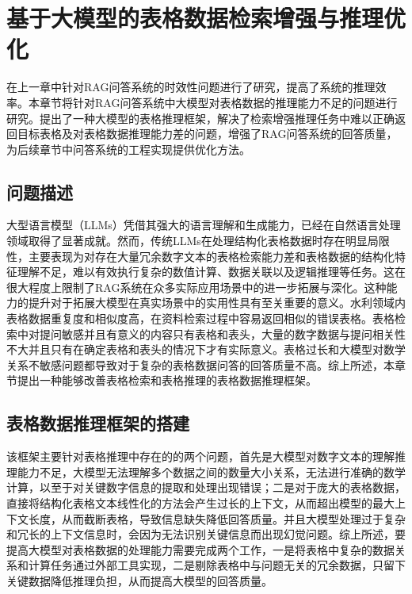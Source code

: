 \chapter{基于大模型的表格数据检索增强与推理优化}
\label{cha:第四章}
在上一章中针对RAG问答系统的时效性问题进行了研究，提高了系统的推理效率。本章节将针对RAG问答系统中大模型对表格数据的推理能力不足的问题进行研究。提出了一种大模型的表格推理框架，解决了检索增强推理任务中难以正确返回目标表格及对表格数据推理能力差的问题，增强了RAG问答系统的回答质量，为后续章节中问答系统的工程实现提供优化方法。
\section{问题描述}
大型语言模型（LLMs）凭借其强大的语言理解和生成能力，已经在自然语言处理领域取得了显著成就。然而，传统LLMs在处理结构化表格数据时存在明显局限性，主要表现为对存在大量冗余数字文本的表格检索能力差和表格数据的结构化特征理解不足，难以有效执行复杂的数值计算、数据关联以及逻辑推理等任务。这在很大程度上限制了RAG系统在众多实际应用场景中的进一步拓展与深化。这种能力的提升对于拓展大模型在真实场景中的实用性具有至关重要的意义。水利领域内表格数据重复度和相似度高，在资料检索过程中容易返回相似的错误表格。表格检索中对提问敏感并且有意义的内容只有表格和表头，大量的数字数据与提问相关性不大并且只有在确定表格和表头的情况下才有实际意义。表格过长和大模型对数学关系不敏感问题都导致对于复杂的表格数据问答的回答质量不高。综上所述，本章节提出一种能够改善表格检索和表格推理的表格数据推理框架。

\section{表格数据推理框架的搭建}

该框架主要针对表格推理中存在的的两个问题，首先是大模型对数字文本的理解推理能力不足，大模型无法理解多个数据之间的数量大小关系，无法进行准确的数学计算，以至于对关键数字信息的提取和处理出现错误；二是对于庞大的表格数据，直接将结构化表格文本线性化的方法会产生过长的上下文，从而超出模型的最大上下文长度，从而截断表格，导致信息缺失降低回答质量。并且大模型处理过于复杂和冗长的上下文信息时，会因为无法识别关键信息而出现幻觉问题。综上所述，要提高大模型对表格数据的处理能力需要完成两个工作，一是将表格中复杂的数据关系和计算任务通过外部工具实现，二是剔除表格中与问题无关的冗余数据，只留下关键数据降低推理负担，从而提高大模型的回答质量。

